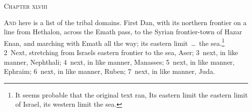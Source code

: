 \documentclass[10pt]{book} %
\begin{document}
\begin{large}\begin{center}\textsc{Chapter xlviii}\end{center}\end{large}
\lettrine[lines=2]{A}{nd} here is a list of the tribal domains. First Dan, with its northern frontier on a line from Hethalon, across the Emath pass, to the Syrian frontier-town of Hazar Enan, and marching with Emath all the way; its eastern limit~\ldots\  the sea.\footnote[1]{It seems probable that the original text ran, \textasciigrave Its eastern limit the eastern limit of Israel, its western limit the sea\textquotesingle .} \textcolor{benred8}{2}~Next, stretching from Israel\textquotesingle s eastern frontier to the sea, Aser; \textcolor{benred8}{3}~next, in like manner, Nephthali; \textcolor{benred8}{4}~next, in like manner, Manasses; \textcolor{benred8}{5}~next, in like manner, Ephraim; \textcolor{benred8}{6}~next, in like manner, Ruben; \textcolor{benred8}{7}~next, in like manner, Juda.
\end{document}
